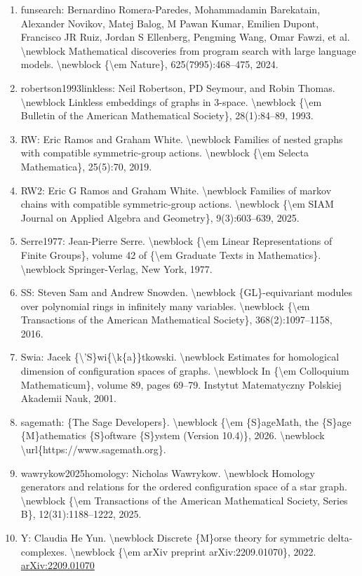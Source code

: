 \documentclass[11pt]{article}
\begin{document}
\begin{enumerate}[leftmargin=*]
  \item funsearch: Bernardino Romera-Paredes, Mohammadamin Barekatain, Alexander Novikov, Matej Balog, M Pawan Kumar, Emilien Dupont, Francisco JR Ruiz, Jordan S Ellenberg, Pengming Wang, Omar Fawzi, et al. \textbackslash{}newblock Mathematical discoveries from program search with large language models. \textbackslash{}newblock \{\textbackslash{}em Nature\}, 625(7995):468--475, 2024.
  \item robertson1993linkless: Neil Robertson, PD Seymour, and Robin Thomas. \textbackslash{}newblock Linkless embeddings of graphs in 3-space. \textbackslash{}newblock \{\textbackslash{}em Bulletin of the American Mathematical Society\}, 28(1):84--89, 1993.
  \item RW: Eric Ramos and Graham White. \textbackslash{}newblock Families of nested graphs with compatible symmetric-group actions. \textbackslash{}newblock \{\textbackslash{}em Selecta Mathematica\}, 25(5):70, 2019.
  \item RW2: Eric G Ramos and Graham White. \textbackslash{}newblock Families of markov chains with compatible symmetric-group actions. \textbackslash{}newblock \{\textbackslash{}em SIAM Journal on Applied Algebra and Geometry\}, 9(3):603--639, 2025.
  \item Serre1977: Jean-Pierre Serre. \textbackslash{}newblock \{\textbackslash{}em Linear Representations of Finite Groups\}, volume 42 of \{\textbackslash{}em Graduate Texts in Mathematics\}. \textbackslash{}newblock Springer-Verlag, New York, 1977.
  \item SS: Steven Sam and Andrew Snowden. \textbackslash{}newblock \{GL\}-equivariant modules over polynomial rings in infinitely many variables. \textbackslash{}newblock \{\textbackslash{}em Transactions of the American Mathematical Society\}, 368(2):1097--1158, 2016.
  \item Swia: Jacek \{\textbackslash{}'S\}wi\{\textbackslash{}k\{a\}\}tkowski. \textbackslash{}newblock Estimates for homological dimension of configuration spaces of graphs. \textbackslash{}newblock In \{\textbackslash{}em Colloquium Mathematicum\}, volume 89, pages 69--79. Instytut Matematyczny Polskiej Akademii Nauk, 2001.
  \item sagemath: \{The Sage Developers\}. \textbackslash{}newblock \{\textbackslash{}em \{S\}ageMath, the \{S\}age \{M\}athematics \{S\}oftware \{S\}ystem (Version 10.4)\}, 2026. \textbackslash{}newblock \textbackslash{}url\{https://www.sagemath.org\}.
  \item wawrykow2025homology: Nicholas Wawrykow. \textbackslash{}newblock Homology generators and relations for the ordered configuration space of a star graph. \textbackslash{}newblock \{\textbackslash{}em Transactions of the American Mathematical Society, Series B\}, 12(31):1188--1222, 2025.
  \item Y: Claudia He Yun. \textbackslash{}newblock Discrete \{M\}orse theory for symmetric delta-complexes. \textbackslash{}newblock \{\textbackslash{}em arXiv preprint arXiv:2209.01070\}, 2022. \href{https://arxiv.org/abs/2209.01070}{arXiv:2209.01070}
\end{enumerate}

% 
% 
\end{document}
